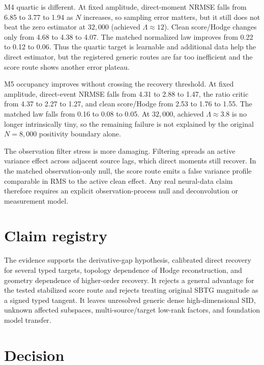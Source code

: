 \documentclass[11pt]{article}
\begin{document}
M4 quartic is different.  At fixed amplitude, direct-moment NRMSE falls from
6.85 to 3.77 to 1.94 as $N$ increases, so sampling error matters, but it still
does not beat the zero estimator at $32{,}000$ (achieved $\Lambda\approx12$).
Clean score/Hodge changes only from 4.68 to 4.38 to 4.07.  The matched normalized
law improves from 0.22 to 0.12 to 0.06.  Thus the quartic target is learnable and
additional data help the direct estimator, but the registered generic routes are
far too inefficient and the score route shows another error plateau.

M5 occupancy improves without crossing the recovery threshold.  At fixed
amplitude, direct-event NRMSE falls from 4.31 to 2.88 to 1.47, the ratio critic
from 4.37 to 2.27 to 1.27, and clean score/Hodge from 2.53 to 1.76 to 1.55.
The matched law falls from 0.16 to 0.08 to 0.05.  At $32{,}000$, achieved
$\Lambda\approx3.8$ is no longer intrinsically tiny, so the remaining failure is
not explained by the original $N=8{,}000$ positivity boundary alone.

The observation filter stress is more damaging.  Filtering spreads an active
variance effect across adjacent source lags, which direct moments still recover.
In the matched observation-only null, the score route emits a false variance
profile comparable in RMS to the active clean effect.  Any real neural-data claim
therefore requires an explicit observation-process null and deconvolution or
measurement model.

\section{Claim registry}


The evidence supports the derivative-gap hypothesis, calibrated direct recovery
for several typed targets, topology dependence of Hodge reconstruction, and
geometry dependence of higher-order recovery.  It rejects a general advantage for
the tested stabilized score route and rejects treating original SBTG magnitude as
a signed typed tangent.  It leaves unresolved generic dense high-dimensional SID,
unknown affected subspaces, multi-source/target low-rank factors, and foundation
model transfer.

\section{Decision}
\end{document}
